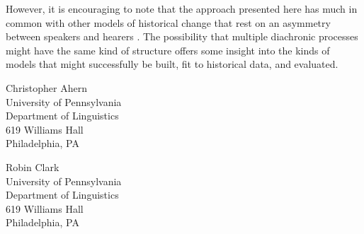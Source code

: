 \documentclass[linguex]{sp}
\theoremstyle{definition} \newtheorem{definition}{Definition}
\begin{document}
However, it  is encouraging to note that the approach presented here has much in common with other models of historical change that rest on an asymmetry between speakers and hearers  \citep{schaden2012, ahern2015, enke2016}.  The possibility that multiple diachronic processes might have the same kind of structure offers some insight into the kinds of models that might successfully be built, fit to historical data, and evaluated.









\begin{addresses}
  \begin{address}
    Christopher Ahern \\
    University of Pennsylvania\\
    Department of Linguistics\\
    619 Williams Hall \\
    Philadelphia, PA \\
  \end{address}
  \begin{address}
    Robin Clark \\
    University of Pennsylvania\\
    Department of Linguistics\\
    619 Williams Hall \\
    Philadelphia, PA\\
  \end{address}
\end{addresses}

\appendix

\pagebreak

\renewcommand{\arraystretch}{1.5}
\end{document}
